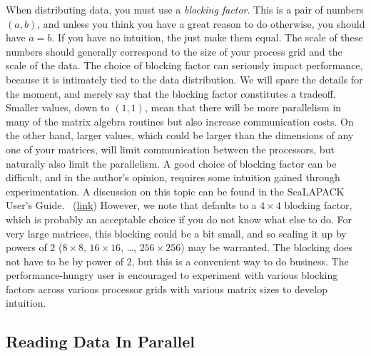 When distributing data, you must use a \emph{blocking factor}.  This is a pair of numbers $(a,b)$, and unless you think you have a great reason to do otherwise, you should have $a=b$.  If you have no intuition, the just make them equal.  The scale of these numbers should generally correspond to the size of your process grid and the scale of the data.  The choice of blocking factor can seriously impact performance, because it is intimately tied to the data distribution.  We will spare the details for the moment, and merely say that the blocking factor constitutes a tradeoff.  Smaller values, down to $(1,1)$, mean that there will be more parallelism in many of the matrix algebra routines but also increase communication costs.  On the other hand, larger values, which could be larger than the dimensions of any one of your matrices, will limit communication between the processors, but naturally also limit the parallelism.
\np
A good choice of blocking factor can be difficult, and in the author's opinion, requires some intuition gained through experimentation.  A discussion on this topic can be found in the ScaLAPACK User's Guide.~\citep{slug} (\href{http://www.netlib.org/utk/papers/scalapack/node19.html}{link}) However, we note that  defaults to a $4\times 4$ blocking factor, which is probably an acceptable choice if you do not know what else to do.  For very large matrices, this blocking could be a bit small, and so scaling it up by powers of 2 ($8\times 8$, $16\times 16$, \dots, $256\times 256$) may be warranted.  The blocking does not have to be by power of 2, but this is a convenient way to do business.  The performance-hungry user is encouraged to experiment with various blocking factors across various processor grids with various matrix sizes to develop intuition.



\subsection[]{Reading Data In Parallel}

